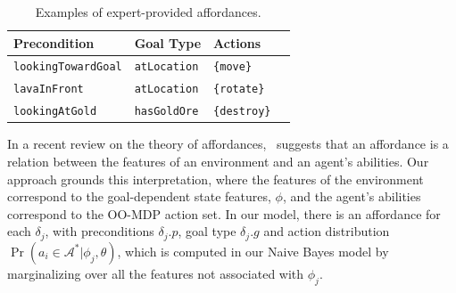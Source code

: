 \documentclass[letterpaper]{article}
\newcommand{\ra}[1]{\renewcommand{\arraystretch}{#1}} %
\begin{document}
\begin{table}[b]
\ra{1.35}
\small
\begin{tabular}{@{}llll@{}}\toprule
Precondition & Goal Type & Actions \\ \midrule
\texttt{lookingTowardGoal} & \texttt{atLocation} & \texttt{\{move\}} \\
\texttt{lavaInFront} & \texttt{atLocation} & \texttt{\{rotate\}} \\
\texttt{lookingAtGold} & \texttt{hasGoldOre} & \texttt{\{destroy\}} \\
\bottomrule
\end{tabular}

\caption{Examples of expert-provided affordances.\label{table:afford_kb_exp}}
\end{table}

In a recent review on the theory of affordances,~\citet{chemero2003}
suggests that an affordance is a relation between the features of an
environment and an agent's abilities. Our approach grounds this
interpretation, where the features of the environment correspond to
the goal-dependent state features, $\phi$, and the agent's abilities
correspond to the OO-MDP action set. In our model, there is an
affordance for each $\delta_j$, with preconditions $\delta_j.p$, goal
type $\delta_j.g$ and action distribution $\Pr(a_i \in \mathcal{A}^* | \phi_j,
\theta)$, which is computed in our Naive Bayes model by marginalizing
over all the features not associated with $\phi_j$.

\end{document}
